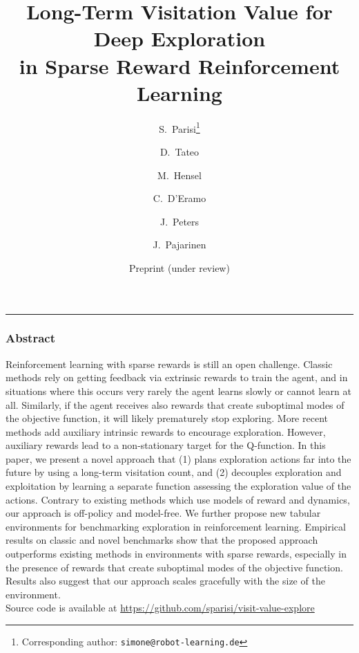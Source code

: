 \documentclass{article}
\begin{document}
\title{Long-Term Visitation Value for Deep Exploration \\in Sparse Reward Reinforcement Learning}

\author[1]{S.~Parisi\thanks{Corresponding author: \texttt{simone@robot-learning.de}}}
\author[1]{D.~Tateo}
\author[1]{M.~Hensel}
\author[1]{C.~D'Eramo}
\author[1,2]{J.~Peters}
\author[1,3]{J.~Pajarinen}
\date{\small Preprint (under review)}


\maketitle

\hrule
\subsubsection*{Abstract}
Reinforcement learning with sparse rewards is still an open challenge. Classic methods rely on getting feedback via extrinsic rewards to train the agent, and in situations where this occurs very rarely the agent learns slowly or cannot learn at all. Similarly, if the agent receives also rewards that create suboptimal modes of the objective function, it will likely prematurely stop exploring. 
More recent methods add auxiliary intrinsic rewards to encourage exploration. 
However, auxiliary rewards lead to a non-stationary target for the Q-function. 
In this paper, we present a novel approach that (1) plans exploration actions far into the future by using a long-term visitation count, and (2) decouples exploration and exploitation by learning a separate function assessing the exploration value of the actions. 
Contrary to existing methods which use models of reward and dynamics, our approach is off-policy and model-free. 
We further propose new tabular environments for benchmarking exploration in reinforcement learning.
Empirical results on classic and novel benchmarks show that the proposed approach outperforms existing methods in environments with sparse rewards, especially in the presence of rewards that create suboptimal modes of the objective function. Results also suggest that our approach scales gracefully with the size of the environment. 
\\
Source code is available at \url{https://github.com/sparisi/visit-value-explore}
\end{document}
